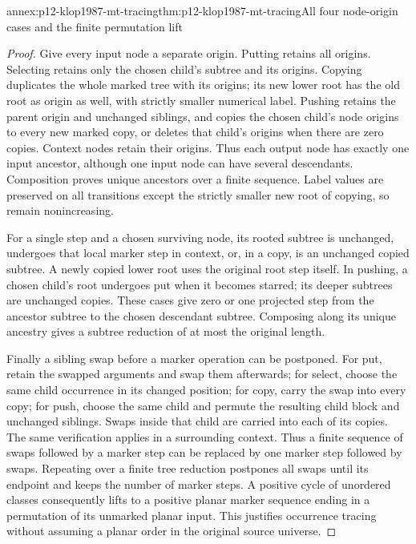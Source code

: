\begin{annexitem}{annex:p12-klop1987-mt-tracing}{thm:p12-klop1987-mt-tracing}{All four node-origin cases and the finite permutation lift}
\begin{proof}
Give every input node a separate origin. Putting retains all origins.
Selecting retains only the chosen child's subtree and its origins.
Copying duplicates the whole marked tree with its origins; its new
lower root has the old root as origin as well, with strictly smaller
numerical label. Pushing retains the parent origin and unchanged
siblings, and copies the chosen child's node origins to every new
marked copy, or deletes that child's origins when there are zero
copies. Context nodes retain their origins. Thus each output node
has exactly one input ancestor, although one input node can have
several descendants. Composition proves unique ancestors over a
finite sequence. Label values are preserved on all transitions except
the strictly smaller new root of copying, so remain nonincreasing.

For a single step and a chosen surviving node, its rooted subtree is
unchanged, undergoes that local marker step in context, or, in a copy,
is an unchanged copied subtree. A newly copied lower root uses the
original root step itself. In pushing, a chosen child's root undergoes
put when it becomes starred; its deeper subtrees are unchanged copies.
These cases give zero or one projected step from the ancestor subtree
to the chosen descendant subtree. Composing along its unique ancestry
gives a subtree reduction of at most the original length.

Finally a sibling swap before a marker operation can be postponed.
For put, retain the swapped arguments and swap them afterwards; for
select, choose the same child occurrence in its changed position;
for copy, carry the swap into every copy; for push, choose the same
child and permute the resulting child block and unchanged siblings.
Swaps inside that child are carried into each of its copies. The
same verification applies in a surrounding context. Thus a finite
sequence of swaps followed by a marker step can be replaced by one
marker step followed by swaps. Repeating over a finite tree reduction
postpones all swaps until its endpoint and keeps the number of marker
steps. A positive cycle of unordered classes consequently lifts to
a positive planar marker sequence ending in a permutation of its
unmarked planar input. This justifies occurrence tracing without
assuming a planar order in the original source universe.
\end{proof}
\end{annexitem}

